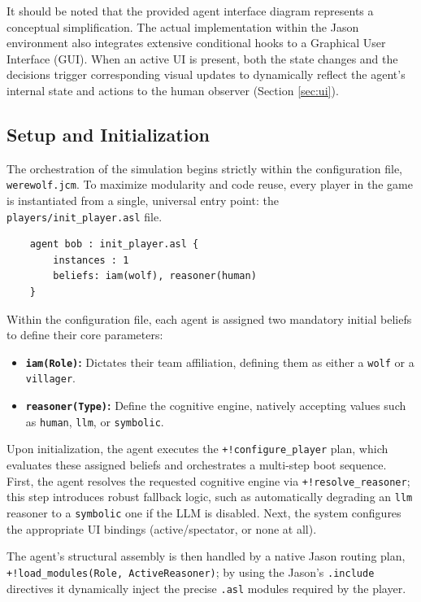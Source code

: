 It should be noted that the provided agent interface diagram represents a conceptual simplification. The actual implementation within the Jason environment also integrates extensive conditional hooks to a Graphical User Interface (GUI). When an active UI is present, both the state changes and the decisions trigger corresponding visual updates to dynamically reflect the agent's internal state and actions to the human observer (Section \ref{sec:ui}).


\subsection{Setup and Initialization}
\label{subsec:player-setup}

The orchestration of the simulation begins strictly within the configuration file, \texttt{werewolf.jcm}. To maximize modularity and code reuse, every player in the game is instantiated from a single, universal entry point: the \texttt{players/init\_player.asl} file.

\begin{verbatim}
    agent bob : init_player.asl {
        instances : 1
        beliefs: iam(wolf), reasoner(human)
    }
\end{verbatim}

Within the configuration file, each agent is assigned two mandatory initial beliefs to define their core parameters:
\begin{itemize}
    \item \textbf{\texttt{iam(Role)}:} Dictates their team affiliation, defining them as either a \texttt{wolf} or a \texttt{villager}.
    
    \item \textbf{\texttt{reasoner(Type)}:} Define the cognitive engine, natively accepting values such as \texttt{human}, \texttt{llm}, or \texttt{symbolic}.
\end{itemize}

Upon initialization, the agent executes the \texttt{+!configure\_player} plan, which evaluates these assigned beliefs and orchestrates a multi-step boot sequence. First, the agent resolves the requested cognitive engine via \texttt{+!resolve\_reasoner}; this step introduces robust fallback logic, such as automatically degrading an \texttt{llm} reasoner to a \texttt{symbolic} one if the LLM is disabled. Next, the system configures the appropriate UI bindings (active/spectator, or none at all).

The agent's structural assembly is then handled by a native Jason routing plan, \texttt{+!load\_modules(Role, ActiveReasoner)}; by using the  Jason's \texttt{.include} directives it dynamically inject the precise \texttt{.asl} modules required by the player.

